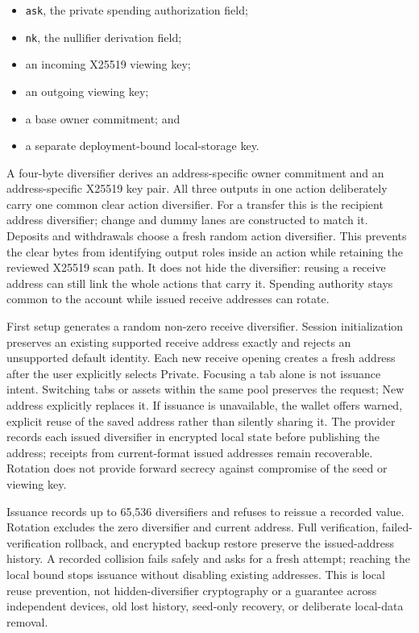 \documentclass[11pt,letterpaper]{article}
\providecommand{\tightlist}{\setlength{\itemsep}{0pt}\setlength{\parskip}{0pt}}
\begin{document}
\begin{itemize}
\tightlist
\item
  \texttt{ask}, the private spending authorization field;
\item
  \texttt{nk}, the nullifier derivation field;
\item
  an incoming X25519 viewing key;
\item
  an outgoing viewing key;
\item
  a base owner commitment; and
\item
  a separate deployment-bound local-storage key.
\end{itemize}

A four-byte diversifier derives an address-specific owner commitment and
an address-specific X25519 key pair. All three outputs in one action
deliberately carry one common clear action diversifier. For a transfer
this is the recipient address diversifier; change and dummy lanes are
constructed to match it. Deposits and withdrawals choose a fresh random
action diversifier. This prevents the clear bytes from identifying
output roles inside an action while retaining the reviewed X25519 scan
path. It does not hide the diversifier: reusing a receive address can
still link the whole actions that carry it. Spending authority stays
common to the account while issued receive addresses can rotate.

First setup generates a random non-zero receive diversifier. Session
initialization preserves an existing supported receive address exactly
and rejects an unsupported default identity. Each new receive opening
creates a fresh address after the user explicitly selects Private.
Focusing a tab alone is not issuance intent. Switching tabs or assets
within the same pool preserves the request; New address explicitly
replaces it. If issuance is unavailable, the wallet offers warned,
explicit reuse of the saved address rather than silently sharing it. The
provider records each issued diversifier in encrypted local state before
publishing the address; receipts from current-format issued addresses
remain recoverable. Rotation does not provide forward secrecy against
compromise of the seed or viewing key.

Issuance records up to 65,536 diversifiers and refuses to reissue a
recorded value. Rotation excludes the zero diversifier and current
address. Full verification, failed-verification rollback, and encrypted
backup restore preserve the issued-address history. A recorded collision
fails safely and asks for a fresh attempt; reaching the local bound
stops issuance without disabling existing addresses. This is local reuse
prevention, not hidden-diversifier cryptography or a guarantee across
independent devices, old lost history, seed-only recovery, or deliberate
local-data removal.
\end{document}
